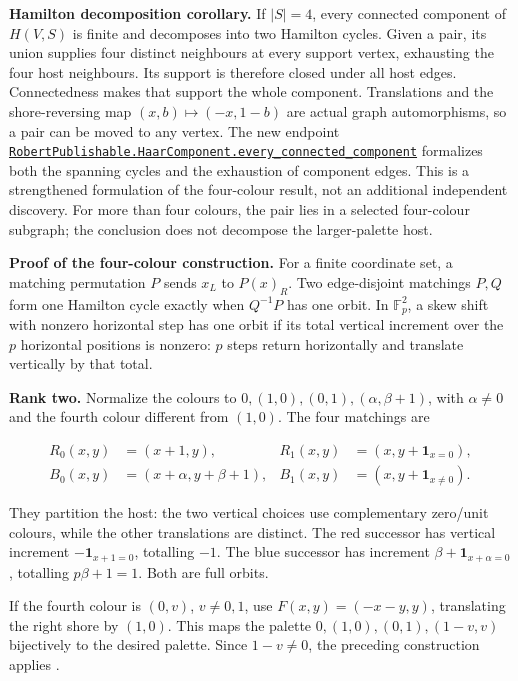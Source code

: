 \documentclass[smallextended]{svjour3}
\begin{document}
\textbf{Hamilton decomposition corollary.} If \(|S|=4\), every connected
component of \(H(V,S)\) is finite and decomposes into two Hamilton
cycles. Given a pair, its union supplies four distinct neighbours at
every support vertex, exhausting the four host neighbours. Its support
is therefore closed under all host edges. Connectedness makes that
support the whole component. Translations and the shore-reversing map
\((x,b)\mapsto(-x,1-b)\) are actual graph automorphisms, so a pair can
be moved to any vertex. The new endpoint
\href{https://github.com/alejandrozu/openmath-2026-judging/blob/70c5ec3107658182f22c207d4c50f53f9cb3e602/robert-review-2026-10-07/lean/HaarComponents.lean\#L73}{{\ttfamily\nolinkurl{RobertPublishable.HaarComponent.every_connected_component}}}
formalizes both the spanning cycles and the exhaustion of component
edges. This is a strengthened formulation of the four-colour result, not
an additional independent discovery. For more than four colours, the
pair lies in a selected four-colour subgraph; the conclusion does not
decompose the larger-palette host.

\textbf{Proof of the four-colour construction.} For a finite coordinate
set, a matching permutation \(P\) sends \(x_L\) to \(P(x)_R\). Two
edge-disjoint matchings \(P,Q\) form one Hamilton cycle exactly when
\(Q^{-1}P\) has one orbit. In \(\mathbb F_p^2\), a skew shift with
nonzero horizontal step has one orbit if its total vertical increment
over the \(p\) horizontal positions is nonzero: \(p\) steps return
horizontally and translate vertically by that total.

\textbf{Rank two.} Normalize the colours to
\(0,(1,0),(0,1),(\alpha,\beta+1)\), with \(\alpha\ne0\) and the fourth
colour different from \((1,0)\). The four matchings are

\[
\begin{aligned}
R_0(x,y)&=(x+1,y),&R_1(x,y)&=(x,y+\mathbf1_{x=0}),\\
B_0(x,y)&=(x+\alpha,y+\beta+1),&
B_1(x,y)&=(x,y+\mathbf1_{x\ne0}).
\end{aligned}
\]

They partition the host: the two vertical choices use complementary
zero/unit colours, while the other translations are distinct. The red
successor has vertical increment \(-\mathbf1_{x+1=0}\), totalling
\(-1\). The blue successor has increment
\(\beta+\mathbf1_{x+\alpha=0}\), totalling \(p\beta+1=1\). Both are full
orbits.

If the fourth colour is \((0,v)\), \(v\ne0,1\), use \(F(x,y)=(-x-y,y)\),
translating the right shore by \((1,0)\). This maps the palette
\(0,(1,0),(0,1),(1-v,v)\) bijectively to the desired palette. Since
\(1-v\ne0\), the preceding construction applies \cite{ref11}.
\end{document}
